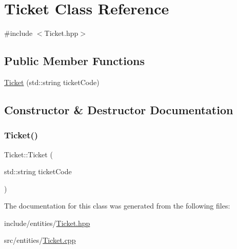 \hypertarget{class_ticket}{}\section{Ticket Class Reference}
\label{class_ticket}


{\ttfamily \#include $<$Ticket.\+hpp$>$}

\subsection*{Public Member Functions}
\begin{DoxyCompactItemize}
\item 
\mbox{\hyperlink{class_ticket_a84520fb1ab1eec222a6ad84df0ed0cfd}{Ticket}} (std\+::string ticket\+Code)
\end{DoxyCompactItemize}


\subsection{Constructor \& Destructor Documentation}
\mbox{\label{class_ticket_a84520fb1ab1eec222a6ad84df0ed0cfd}} 
\subsubsection{\texorpdfstring{Ticket()}{Ticket()}}
{\footnotesize\ttfamily Ticket\+::\+Ticket (\begin{DoxyParamCaption}\item[{std\+::string}]{ticket\+Code }\end{DoxyParamCaption})}



The documentation for this class was generated from the following files\+:\begin{DoxyCompactItemize}
\item 
include/entities/\mbox{\hyperlink{_ticket_8hpp}{Ticket.\+hpp}}\item 
src/entities/\mbox{\hyperlink{_ticket_8cpp}{Ticket.\+cpp}}\end{DoxyCompactItemize}
